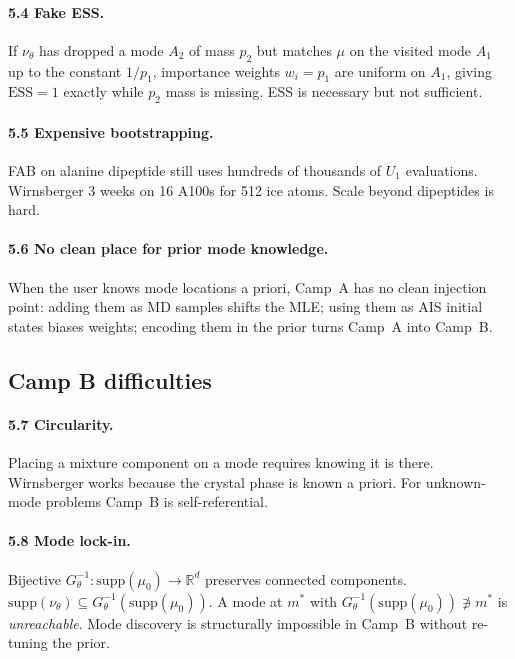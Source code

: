 \documentclass[11pt,letterpaper]{article}
\newcommand{\Real}{\mathbb{R}}
\newcommand{\ESS}{\mathrm{ESS}}
\theoremstyle{plain}
\begin{document}
\paragraph{5.4 Fake ESS.} If $\nu_\theta$ has dropped a mode $A_2$ of mass $p_2$ but
matches $\mu$ on the visited mode $A_1$ up to the constant $1/p_1$, importance
weights $w_i=p_1$ are uniform on $A_1$, giving $\ESS=1$ exactly while $p_2$
mass is missing. ESS is necessary but not sufficient.

\paragraph{5.5 Expensive bootstrapping.} FAB on alanine dipeptide still uses
hundreds of thousands of $U_1$ evaluations. Wirnsberger 3 weeks on 16 A100s for
512 ice atoms. Scale beyond dipeptides is hard.

\paragraph{5.6 No clean place for prior mode knowledge.} When the user knows mode
locations a priori, Camp~A has no clean injection point: adding them as MD samples
shifts the MLE; using them as AIS initial states biases weights; encoding them
in the prior turns Camp~A into Camp~B.

\subsection{Camp B difficulties}

\paragraph{5.7 Circularity.} Placing a mixture component on a mode requires knowing
it is there. Wirnsberger works because the crystal phase is known a priori. For
unknown-mode problems Camp~B is self-referential.

\paragraph{5.8 Mode lock-in.} Bijective $G^{-1}_\theta:\mathrm{supp}(\mu_0)\to\Real^d$
preserves connected components. $\mathrm{supp}(\nu_\theta)\subseteq G^{-1}_\theta(\mathrm{supp}(\mu_0))$.
A mode at $m^*$ with $G^{-1}_\theta(\mathrm{supp}(\mu_0))\not\ni m^*$ is
\emph{unreachable}. Mode discovery is structurally impossible in Camp~B without
re-tuning the prior.
\end{document}
